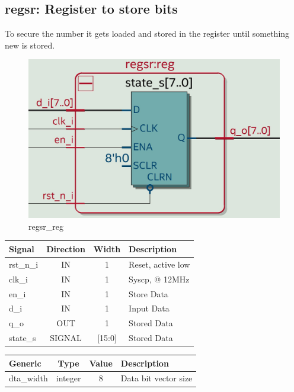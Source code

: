 \documentclass[12pt,a4 paper] {report}
\begin{document}
\subsection{regsr: Register to store bits}
To secure the number it gets loaded and stored in the register until something new is stored.
\begin{figure}[h]
	\centering	
	\includegraphics[scale=0.15]{../png/regsr_reg.png}
	\caption{regsr\_reg}
\end{figure}
\begin{center}
	\begin{tabular}{ | p{2cm} | c | c | p{5cm} |}
		\hline
		\textbf{Signal} & \textbf{Direction} & \textbf{Width} & \textbf{Description} \\
		\hline
		\hline
 		rst\_n\_i & IN & 1 & Reset, active low \\
 		\hline
		clk\_i & IN & 1 & Syscp, @ 12MHz \\
		\hline
		en\_i & IN & 1 & Store Data \\
		\hline
		d\_i & IN & 1 & Input Data \\
		\hline
		q\_o & OUT & 1 & Stored Data \\
		\hline
		\hline
		state\_s & SIGNAL & [15:0] & Stored Data \\
		\hline
	\end{tabular}
\end{center}
\begin{center}
	\begin{tabular}{| p{2cm} | c | c | p{5cm} |}
	\hline
	\textbf{Generic} & \textbf{Type} & \textbf{Value} & \textbf{Description} \\
	\hline
	dta\_width & integer & 8 & Data bit vector size \\
	\hline
	\end{tabular}
\end{center}
\end{document}
